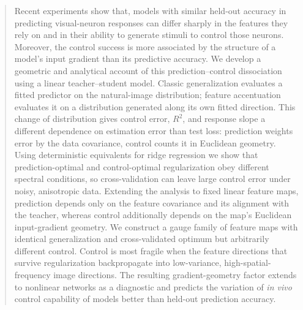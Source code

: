 %

\begin{abstract}
Recent experiments show that, models with similar held-out accuracy in predicting visual-neuron responses can differ sharply in the features they rely on and in their ability to generate stimuli to control those neurons. Moreover, the control success is more associated by the structure of a model's input gradient than its predictive accuracy.
We develop a geometric and analytical account of this prediction--control dissociation using a linear teacher--student model.
Classic generalization evaluates a fitted predictor on the natural-image distribution; feature accentuation evaluates it on a distribution generated along its own fitted direction. This change of distribution gives control error, $R^2$, and response slope a different dependence on estimation error than test loss: prediction weights error by the data covariance, control counts it in Euclidean geometry. Using deterministic equivalents for ridge regression we show that prediction-optimal and control-optimal regularization obey different spectral conditions, so cross-validation can leave large control error under noisy, anisotropic data. Extending the analysis to fixed linear feature maps, prediction depends only on the feature covariance and its alignment with the teacher, whereas control additionally depends on the map's Euclidean input-gradient geometry. We construct a gauge family of feature maps with identical generalization and cross-validated optimum but arbitrarily different control.  Control is most fragile when the feature directions that survive regularization backpropagate into low-variance, high-spatial-frequency image directions. The resulting gradient-geometry factor extends to nonlinear networks as a diagnostic and predicts the variation of \textit{in vivo} control capability of models better than held-out prediction accuracy.
\end{abstract}

